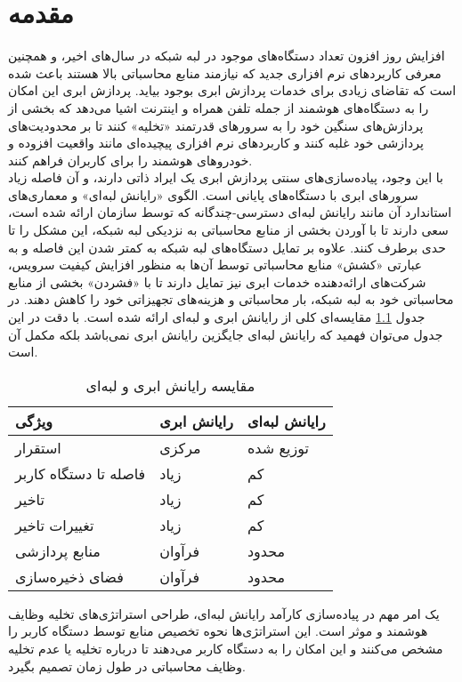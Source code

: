\chapter{مقدمه} 
افزایش روز افزون تعداد دستگاه‌های موجود در لبه شبکه در سال‌های اخیر، و همچنین معرفی کاربردهای نرم افزاری جدید که نیازمند منابع محاسباتی بالا هستند باعث شده است که تقاضای زیادی برای خدمات پردازش ابری بوجود بیاید. پردازش ابری این امکان را به دستگاه‌های هوشمند از جمله تلفن همراه و اینترنت اشیا می‌دهد که بخشی از پردازش‌های سنگین خود را به سرورهای قدرتمند «تخلیه» کنند تا بر محدودیت‌های پردازشی خود غلبه کنند و کاربردهای نرم افزاری پیچیده‌ای مانند واقعیت افزوده و خودروهای هوشمند را برای کاربران فراهم کنند. \\

با این وجود، پیاده‌سازی‌های سنتی پردازش ابری یک ایراد ذاتی دارند، و آن فاصله زیاد سرورهای ابری با دستگاه‌های پایانی است. الگوی «رایانش لبه‌ای» و معماری‌های استاندارد آن مانند رایانش لبه‌ای دسترسی-چندگانه که توسط سازمان  ارائه شده است، سعی دارند تا با آوردن بخشی از منابع محاسباتی به نزدیکی لبه شبکه، این مشکل را تا حدی برطرف کنند. علاوه بر تمایل دستگاه‌های لبه شبکه به کمتر شدن این فاصله و به عبارتی «کشش» منابع محاسباتی توسط آن‌ها به منظور افزایش کیفیت سرویس، شرکت‌های ارائه‌دهنده خدمات ابری نیز تمایل دارند تا با «فشردن» بخشی از منابع محاسباتی خود به لبه شبکه، بار محاسباتی و هزینه‌های تجهیزاتی خود را کاهش دهند. \cite{edgevisions} در جدول \ref{table:compare} مقایسه‌ای کلی از رایانش ابری و لبه‌ای ارائه شده است. با دقت در این جدول می‌توان فهمید که رایانش لبه‌ای جایگزین رایانش ابری نمی‌باشد بلکه مکمل آن است.
\newpage
\begin{table}[H]
	\centering
	\begin{tabular}{@{}lll@{}}
		\toprule
		ویژگی    & رایانش ابری         & رایانش لبه‌ای \\ \midrule
		استقرار          & مرکزی & توزیع شده    \\
		فاصله تا دستگاه کاربر  & زیاد        & کم            \\
		تاخیر             & زیاد        & کم            \\
		تغییرات تاخیر\footnotemark              & زیاد        & کم            \\
		منابع پردازشی & فرآوان       & محدود        \\
		فضای ذخیره‌سازی    & فرآوان       & محدود        \\ \bottomrule
	\end{tabular}
	\caption{مقایسه رایانش ابری و لبه‌ای}
	\label{table:compare}
\end{table}
یک امر مهم در پیاده‌سازی کارآمد رایانش لبه‌ای، طراحی استراتژی‌های تخلیه وظایف هوشمند و موثر است. این استراتژی‌ها نحوه تخصیص منابع توسط دستگاه کاربر را مشخص می‌کنند و این امکان را به دستگاه کاربر می‌دهند تا درباره تخلیه یا عدم تخلیه وظایف محاسباتی در طول زمان تصمیم بگیرد. \\

